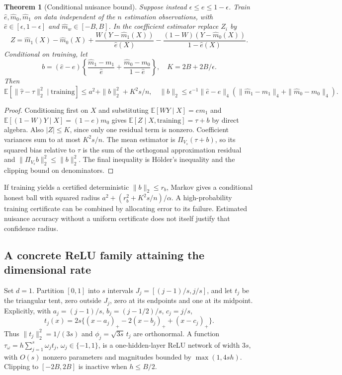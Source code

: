 \documentclass[11pt,a4paper]{article}
\newtheorem{theorem}{Theorem}
\newcommand{\E}{\mathbb E}
\begin{document}
\begin{theorem}[Conditional nuisance bound]
Suppose instead $\epsilon\leq e\leq1-\epsilon$. Train $\widehat e,\widehat m_0,\widehat m_1$ on data independent of the $n$ estimation observations, with $\widehat e\in[\epsilon,1-\epsilon]$ and $\widehat m_w\in[-B,B]$. In the coefficient estimator replace $Z_i$ by
\[
 Z=\widehat m_1(X)-\widehat m_0(X)
       +\frac{W(Y-\widehat m_1(X))}{\widehat e(X)}
       -\frac{(1-W)(Y-\widehat m_0(X))}{1-\widehat e(X)}.
\]
Conditional on training, let
\[
 b=(\widehat e-e)
       \left\{\frac{\widehat m_1-m_1}{\widehat e}
                  +\frac{\widehat m_0-m_0}{1-\widehat e}\right\},
 \quad K=2B+2B/\epsilon.
\]
Then
\[
 \E[\|\widehat\tau-\tau\|_2^2\mid\text{training}]
 \leq a^2+\|b\|_2^2+K^2s/n,
 \quad
 \|b\|_2\leq\epsilon^{-1}\|\widehat e-e\|_4
       (\|\widehat m_1-m_1\|_4+\|\widehat m_0-m_0\|_4).
\]
\end{theorem}
\begin{proof}
Conditioning first on $X$ and substituting $\E[WY\mid X]=em_1$ and $\E[(1-W)Y\mid X]=(1-e)m_0$ gives $\E[Z\mid X,\text{training}]=\tau+b$ by direct algebra. Also $|Z|\leq K$, since only one residual term is nonzero. Coefficient variances sum to at most $K^2s/n$. The mean estimator is $\Pi_{V_s}(\tau+b)$, so its squared bias relative to $\tau$ is the sum of the orthogonal approximation residual and $\|\Pi_{V_s}b\|_2^2\leq\|b\|_2^2$. The final inequality is H\"older's inequality and the clipping bound on denominators.
\end{proof}
If training yields a certified deterministic $\|b\|_2\leq r_b$, Markov gives a conditional honest ball with squared radius $a^2+(r_b^2+K^2s/n)/\alpha$. A high-probability training certificate can be combined by allocating error to its failure. Estimated nuisance accuracy without a uniform certificate does not itself justify that confidence radius.

\subsection*{A concrete ReLU family attaining the dimensional rate}
Set $d=1$. Partition $[0,1]$ into $s$ intervals $J_j=[(j-1)/s,j/s]$, and let $t_j$ be the triangular tent, zero outside $J_j$, zero at its endpoints and one at its midpoint. Explicitly, with $a_j=(j-1)/s$, $b_j=(j-1/2)/s$, $c_j=j/s$,
\[
 t_j(x)=2s\{(x-a_j)_+-2(x-b_j)_++(x-c_j)_+\}.
\]
Thus $\|t_j\|_2^2=1/(3s)$ and $\phi_j=\sqrt{3s}\,t_j$ are orthonormal. A function $\tau_\omega=h\sum_{j=1}^s\omega_jt_j$, $\omega_j\in\{-1,1\}$, is a one-hidden-layer ReLU network of width $3s$, with $O(s)$ nonzero parameters and magnitudes bounded by $\max(1,4sh)$. Clipping to $[-2B,2B]$ is inactive when $h\leq B/2$.
\end{document}
